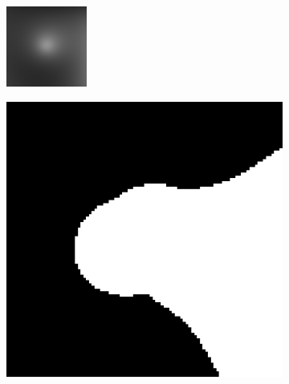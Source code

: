 \documentclass[11pt]{article}
\begin{document}
\begin{figure}[!hbt]
  
    \begin{subfigure}[h]{0.3\textwidth}
    \centering
    \includegraphics[width = \textwidth]{../synth-images/im4.png}
  \end{subfigure} 
   \begin{subfigure}[h]{0.3\textwidth}
    \centering
    \includegraphics[width = \textwidth]{../synth-images/mask.png}

\end{subfigure}
\end{figure}
\end{document}
